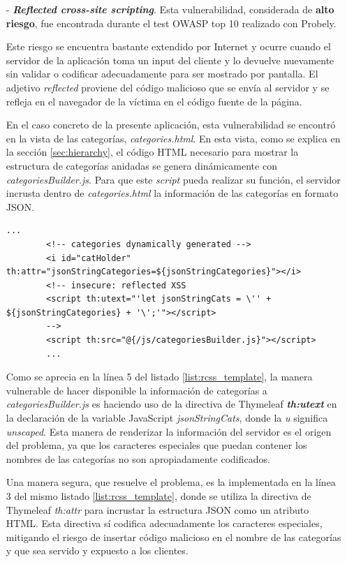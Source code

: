 \documentclass[a4paper,12pt,twoside,openright]{report}
\begin{document}
	\begin{itemize}
		\item[-] \textbf{\emph{Reflected cross-site scripting}}. Esta vulnerabilidad, considerada de \textbf{alto riesgo}, fue encontrada durante el test OWASP top 10 realizado con Probely.
		
		Este riesgo se encuentra bastante extendido por Internet y ocurre cuando el servidor de la aplicación toma un input del cliente y lo devuelve nuevamente sin validar o codificar adecuadamente para ser mostrado por pantalla. El adjetivo \emph{reflected} proviene del código malicioso que se envía al servidor y se refleja en el navegador de la víctima en el código fuente de la página.
		
		En el caso concreto de la presente aplicación, esta vulnerabilidad se encontró en la vista de las categorías, \emph{categories.html}. En esta vista, como se explica en la sección \ref{sec:hierarchy}, el código HTML necesario para mostrar la estructura de categorías anidadas se genera dinámicamente con \emph{categoriesBuilder.js}. Para que este \emph{script} pueda realizar su función, el servidor incrusta dentro de \emph{categories.html} la información de las categorías en formato JSON.
		\\
		
		\begin{lstlisting}[caption=Extracto de categories.html con la vulnerabilidad encontrada,label=list:rcss_template]
		...
		<!-- categories dynamically generated -->
		<i id="catHolder" th:attr="jsonStringCategories=${jsonStringCategories}"></i>
		<!-- insecure: reflected XSS
		<script th:utext="'let jsonStringCats = \'' + ${jsonStringCategories} + '\';'"></script>
		-->
		<script th:src="@{/js/categoriesBuilder.js}"></script>
		...
		\end{lstlisting}
		
		Como se aprecia en la línea 5 del listado \ref{list:rcss_template}, la manera vulnerable de hacer disponible la información de categorías a \emph{categoriesBuilder.js} es haciendo uso de la directiva de Thymeleaf \textbf{\emph{th:utext}} en la declaración de la variable JavaScript \emph{jsonStringCats}, donde la \emph{u} significa \emph{unscaped}. Esta manera de renderizar la información del servidor es el origen del problema, ya que los caracteres especiales que puedan contener los nombres de las categorías no son apropiadamente codificados.
		
		Una manera segura, que resuelve el problema, es la implementada en la línea 3 del mismo listado \ref{list:rcss_template}, donde se utiliza la directiva de Thymeleaf \emph{th:attr} para incrustar la estructura JSON como un atributo HTML. Esta directiva sí codifica adecuadamente los caracteres especiales, mitigando el riesgo de insertar código malicioso en el nombre de las categorías y que sea servido y expuesto a los clientes.
		

\end{itemize}
\end{document}
